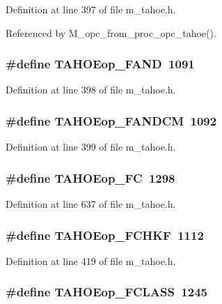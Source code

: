 Definition at line 397 of file m\_\-tahoe.h.

Referenced by M\_\-opc\_\-from\_\-proc\_\-opc\_\-tahoe().
\subsubsection{\setlength{\rightskip}{0pt plus 5cm}\#define TAHOEop\_\-FAND~1091}\label{m__tahoe_8h_b68a84009e7956e2ad5dfb98d2ba970f}




Definition at line 398 of file m\_\-tahoe.h.
\subsubsection{\setlength{\rightskip}{0pt plus 5cm}\#define TAHOEop\_\-FANDCM~1092}\label{m__tahoe_8h_f6c4bd7788f01a14fc540384caf629c2}




Definition at line 399 of file m\_\-tahoe.h.
\subsubsection{\setlength{\rightskip}{0pt plus 5cm}\#define TAHOEop\_\-FC~1298}\label{m__tahoe_8h_fdbb2709bcf0e31accf5d96a55b8a133}




Definition at line 637 of file m\_\-tahoe.h.
\subsubsection{\setlength{\rightskip}{0pt plus 5cm}\#define TAHOEop\_\-FCHKF~1112}\label{m__tahoe_8h_6e0a7d802860ae1b907272ff85684982}




Definition at line 419 of file m\_\-tahoe.h.
\subsubsection{\setlength{\rightskip}{0pt plus 5cm}\#define TAHOEop\_\-FCLASS~1245}\label{m__tahoe_8h_493b82255ecf25332cbac252ba76c313}




